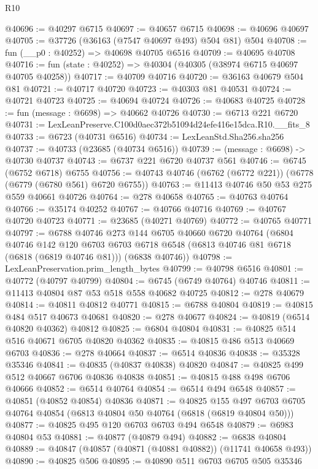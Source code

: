 \begin{lexlean}{R10}
\begin{coremodule}
@40696 := @40297 @6715
@40697 := @40657 @6715
@40698 := @40696 @40697
@40705 := @37726 (@36163 (@7547 @40697 @493) @504 @81) @504
@40708 := fun (__p0 : @40252) => @40698 @40705 @6516
@40709 := @40695 @40708
@40716 := fun (state : @40252) => @40304 (@40305 (@38974 @6715 @40697 @40705 @40258))
@40717 := @40709 @40716
@40720 := @36163 @40679 @504 @81
@40721 := @40717 @40720
@40723 := @40303 @81 @40531
@40724 := @40721 @40723
@40725 := @40694 @40724
@40726 := @40683 @40725
@40728 := fun (message : @6698) => @40662 @40726
@40730 := @6713 @221 @6720
@40731 := LexLeanPreserve.C100d0aec372b51094d24efe416e15dca.R10.__fits_8
@40733 := @6723 (@40731 @6516)
@40734 := LexLeanStd.Sha256.sha256
@40737 := @40733 (@23685 (@40734 @6516))
@40739 := (message : @6698) -> @40730 @40737
@40743 := @6737 @221 @6720 @40737 @561
@40746 := @6745 (@6752 @6718) @6755
@40756 := @40743 @40746 (@6762 (@6772 @221)) (@6778 (@6779 (@6780 @561) @6720 @6755))
@40763 := @11413 @40746 @50 @53 @275 @559 @40661 @40726
@40764 := @278 @40658
@40765 := @40763 @40764
@40766 := @35174 @40252
@40767 := @40766 @40716
@40769 := @40767 @40720 @40723
@40771 := @23685 (@40271 @40769)
@40772 := @40765 @40771
@40797 := @6788
    @40746
    @273
    @144
    @6705
    @40660
    @6720
    @40764
    (@6804
      @40746
      @142
      @120
      @6703
      @6703
      @6718
      @6548
      (@6813 @40746 @81 @6718 (@6818 (@6819 @40746 @81)))
      (@6838 @40746))
@40798 := LexLeanPreservation.prim_length_bytes
@40799 := @40798 @6516
@40801 := @40772 (@40797 @40799)
@40804 := @6745 (@6749 @40764) @40746
@40811 := @11413 @40804 @87 @53 @518 @558 @40682 @40725
@40812 := @278 @40679
@40814 := @40811 @40812 @40771
@40815 := @6788 @40804
@40819 := @40815 @484 @517 @40673 @40681
@40820 := @278 @40677
@40824 := @40819 (@6514 @40820 @40362) @40812
@40825 := @6804 @40804
@40831 := @40825 @514 @516 @40671 @6705 @40820 @40362
@40835 := @40815 @486 @513 @40669 @6703
@40836 := @278 @40664
@40837 := @6514 @40836
@40838 := @35328 @35346
@40841 := @40835 (@40837 @40838) @40820
@40847 := @40825 @499 @512 @40667 @6706 @40836 @40838
@40851 := @40815 @488 @498 @6706 @40666
@40852 := @6514 @40764
@40854 := @6514 @494 @6548
@40857 := @40851 (@40852 @40854) @40836
@40871 := @40825
    @155
    @497
    @6703
    @6705
    @40764
    @40854
    (@6813 @40804 @50 @40764 (@6818 (@6819 @40804 @50)))
@40877 := @40825 @495 @120 @6703 @6703 @494 @6548
@40879 := @6983 @40804 @53
@40881 := @40877 (@40879 @494)
@40882 := @6838 @40804
@40889 := @40847 (@40857 (@40871 (@40881 @40882)) (@11741 @40658 @493))
@40890 := @40825 @506
@40895 := @40890 @511 @6703 @6705 @505 @35346

\end{coremodule}
\end{lexlean}
